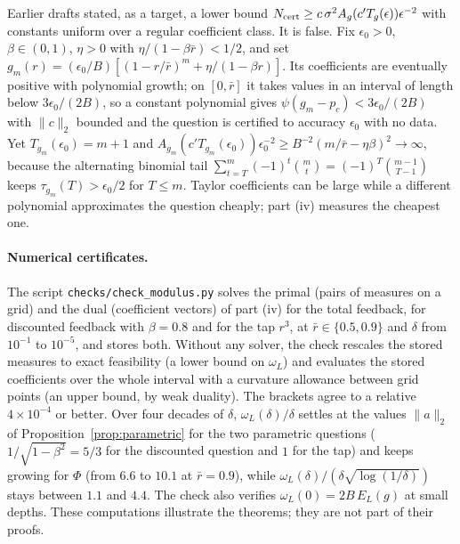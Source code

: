 \begin{remark}\label{rem:energy}
Earlier drafts stated, as a target, a lower bound $N_{\rm cert}\ge c\,\sigma^2A_g(c'T_g(\epsilon))\epsilon^{-2}$ with constants uniform over a regular coefficient class. It is false. Fix $\epsilon_0>0$, $\beta\in(0,1)$, $\eta>0$ with $\eta/(1-\beta\bar r)<1/2$, and set $g_m(r)=(\epsilon_0/B)[(1-r/\bar r)^m+\eta/(1-\beta r)]$. Its coefficients are eventually positive with polynomial growth; on $[0,\bar r]$ it takes values in an interval of length below $3\epsilon_0/(2B)$, so a constant polynomial gives $\psi(g_m-p_c)<3\epsilon_0/(2B)$ with $\|c\|_2$ bounded and the question is certified to accuracy $\epsilon_0$ with no data. Yet $T_{g_m}(\epsilon_0)=m+1$ and $A_{g_m}(c'T_{g_m}(\epsilon_0))\epsilon_0^{-2}\ge B^{-2}(m/\bar r-\eta\beta)^2\to\infty$, because the alternating binomial tail $\sum_{t=T}^m(-1)^t\binom mt=(-1)^T\binom{m-1}{T-1}$ keeps $\tau_{g_m}(T)>\epsilon_0/2$ for $T\le m$. Taylor coefficients can be large while a different polynomial approximates the question cheaply; part (iv) measures the cheapest one.
\end{remark}

\paragraph{Numerical certificates.} The script \texttt{checks/check\_modulus.py} solves the primal (pairs of measures on a grid) and the dual (coefficient vectors) of part (iv) for the total feedback, for discounted feedback with $\beta=0.8$ and for the tap $r^3$, at $\bar r\in\{0.5,0.9\}$ and $\delta$ from $10^{-1}$ to $10^{-5}$, and stores both. Without any solver, the check rescales the stored measures to exact feasibility (a lower bound on $\omega_L$) and evaluates the stored coefficients over the whole interval with a curvature allowance between grid points (an upper bound, by weak duality). The brackets agree to a relative $4\times10^{-4}$ or better. Over four decades of $\delta$, $\omega_L(\delta)/\delta$ settles at the values $\|a\|_2$ of Proposition~\ref{prop:parametric} for the two parametric questions ($1/\sqrt{1-\beta^2}=5/3$ for the discounted question and $1$ for the tap) and keeps growing for $\Phi$ (from $6.6$ to $10.1$ at $\bar r=0.9$), while $\omega_L(\delta)/(\delta\sqrt{\log(1/\delta)})$ stays between $1.1$ and $4.4$. The check also verifies $\omega_L(0)=2B\,E_L(g)$ at small depths. These computations illustrate the theorems; they are not part of their proofs.

